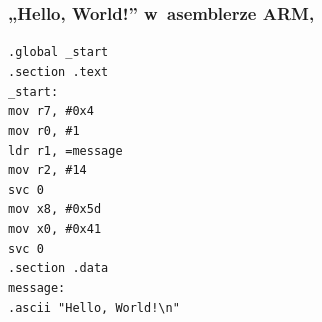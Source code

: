 \documentclass[10pt,t]{beamer}
\begin{document}
\begin{frame}
  \frametitle{„Hello, World!” w~asemblerze ARM,
    \parencite{Low-Level-Learning-You-Can-Learn-ARM-ETC-Ver-2020}}


  \texttt{.global \_start} \\
  \texttt{.section .text} \\



  \texttt{\_start:} \\[-0.2em]
  \hphantom{aaaaaaaa} \texttt{mov r7, \#0x4} \\
  \hphantom{aaaaaaaa} \texttt{mov r0, \#1} \\
  \hphantom{aaaaaaaa} \texttt{ldr r1, =message} \\
  \hphantom{aaaaaaaa} \texttt{mov r2, \#14} \\

  \hphantom{aaaaaaaa} \texttt{svc 0} \\

  \hphantom{aaaaaaaa} \texttt{mov x8, \#0x5d} \\
  \hphantom{aaaaaaaa} \texttt{mov x0, \#0x41} \\

  \hphantom{aaaaaaaa} \texttt{svc 0} \\



  \texttt{.section .data} \\
  \texttt{message:} \\
  \hphantom{aaaaaaaa} \texttt{.ascii "Hello, World!\textbackslash n"}

\end{frame}
\end{document}
